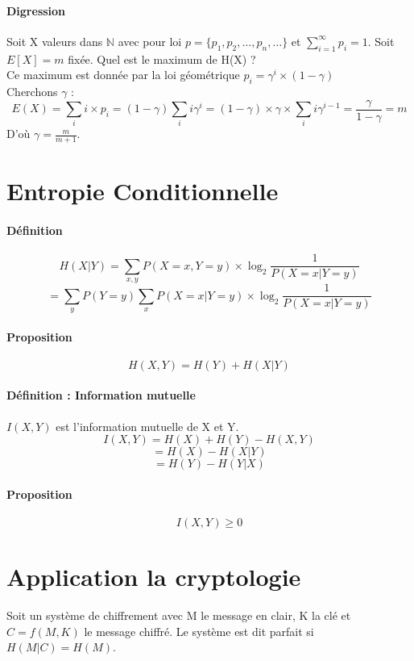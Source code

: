 \documentclass[12pt,a4paper]{report}
\begin{document}
\paragraph{Digression\\}
Soit X  valeurs dans $\mathbb{N}$ avec pour loi $p=\{p_1,p_2,\ldots,p_n,\ldots\}$ et $ \displaystyle\sum_{i=1}^{\infty} p_i=1$. Soit $E[X]=m$ fixée. Quel est le maximum de H(X) ? \\
Ce maximum est donnée par la loi géométrique $ p_i=\gamma ^i \times (1-\gamma)$\\
Cherchons $\gamma$ : \\
$$ E(X)=\sum_{i} i\times p_i = (1-\gamma) \sum_{i} i \gamma ^i 
	= (1-\gamma) \times \gamma \times \sum_{i} i \gamma ^{i-1} 
		= \frac{\gamma}{1-\gamma} = m $$
		D'où $ \gamma = \frac{m}{m+1} $.
		
\section{Entropie Conditionnelle}
\paragraph{Définition\\}
$$H(X|Y)=\displaystyle \sum_{x,y} P(X=x,Y=y)\times \log_2 \frac{1}{P(X=x|Y=y)} $$
$$= \sum_y P(Y=y) \sum_x P(X=x|Y=y) \times \log_2 \frac{1}{P(X=x|Y=y)} $$
\paragraph{Proposition\\}
$$H(X,Y)=H(Y)+H(X|Y) $$
\paragraph{Définition : Information mutuelle \\}
$I(X,Y)$ est l'information mutuelle de X et Y.
$$ I(X,Y)= H(X)+H(Y)-H(X,Y) $$
$$ = H(X) - H(X|Y) $$
$$ = H(Y) - H(Y|X) $$
\paragraph{Proposition\\}
$$I(X,Y) \geqslant 0 $$

\section{Application  la cryptologie}
Soit un système de chiffrement avec M le message en clair, K la clé et $C=f(M,K)$ le message chiffré.
Le système est dit parfait si $H(M|C)=H(M)$.
\end{document}
